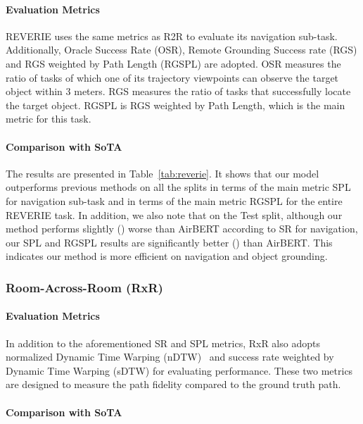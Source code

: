 \documentclass[10pt,twocolumn,letterpaper]{article}
\begin{document}
\paragraph{Evaluation Metrics}
REVERIE uses the same metrics as R2R to evaluate its navigation sub-task.
Additionally, Oracle Success Rate (OSR), Remote Grounding Success rate (RGS) and RGS weighted by Path Length (RGSPL) are adopted. 
OSR measures the ratio of tasks of which one of its trajectory viewpoints can observe the target object within 3 meters. RGS measures the ratio of tasks that successfully locate the target object.
RGSPL is RGS weighted by Path Length, which is the main metric for this task.

\vspace{-0pt}
\paragraph{Comparison with SoTA}
The results are presented in Table~\ref{tab:reverie}. 
It shows that our model outperforms previous methods  on all the splits in terms of the main metric SPL for navigation sub-task and in terms of the main metric RGSPL for the entire REVERIE task.
In addition, we also note that on the Test split, although our method performs slightly () worse than AirBERT according to SR for navigation, our SPL and RGSPL results are significantly better () than AirBERT. This indicates our method is more efficient on navigation and object grounding. 



\subsubsection{Room-Across-Room (RxR)}

\paragraph{Evaluation Metrics}
In addition to the aforementioned SR and SPL metrics, RxR also adopts normalized Dynamic Time Warping (nDTW)~\cite{ndtw} and success rate weighted by Dynamic Time Warping (sDTW) for evaluating performance. These two metrics are designed to measure the path fidelity compared to the ground truth path. 

\vspace{-0pt}
\paragraph{Comparison with SoTA}
\end{document}
